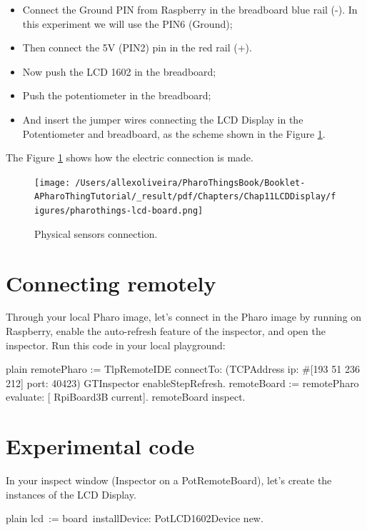 \documentclass[10pt,twoside,english]{_support/latex/sbabook/sbabook}
\begin{document}
\begin{itemize}
\item Connect the Ground PIN from Raspberry in the breadboard blue rail (-). In this experiment we will use the PIN6 (Ground);
\item Then connect the 5V (PIN2) pin in the red rail (+). 
\item Now push the LCD 1602 in the breadboard;
\item Push the potentiometer in the breadboard;
\item And insert the jumper wires connecting the LCD Display in the Potentiometer and breadboard, as the scheme shown in the Figure \ref{physicalLCD}.
\end{itemize}

The Figure \ref{physicalLCD} shows how the electric connection is made.


\begin{figure}

\begin{center}
\texttt{[image: /Users/allexoliveira/PharoThingsBook/Booklet-APharoThingTutorial/\_result/pdf/Chapters/Chap11LCDDisplay/figures/pharothings-lcd-board.png]}\caption{Physical sensors connection.\label{physicalLCD}}\end{center}
\end{figure}

\section{Connecting remotely}
Through your local Pharo image, let’s connect in the Pharo image by running on Raspberry, enable the auto-refresh feature of the inspector, and open the inspector.
Run this code in your local playground:

\begin{displaycode}{plain}
remotePharo := TlpRemoteIDE connectTo: (TCPAddress ip: #[193 51 236 212] port: 40423)
GTInspector enableStepRefresh.
remoteBoard := remotePharo evaluate: [ RpiBoard3B current].
remoteBoard inspect.
\end{displaycode}
\section{Experimental code}
In your inspect window (Inspector on a PotRemoteBoard), let’s create the instances of the LCD Display. 

\begin{displaycode}{plain}
lcd := board installDevice: PotLCD1602Device new.
\end{displaycode}
\end{document}
